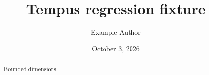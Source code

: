 \documentclass{tempusreport}
\title{Tempus regression fixture}
\author{Example Author}\date{October 3, 2026}
\begin{document}
\maketitle
\begin{abstract}Bounded dimensions.\end{abstract}
\end{document}
